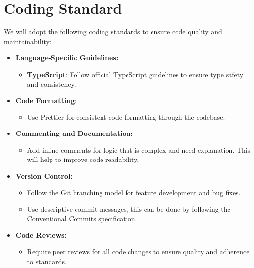 \documentclass{article}
\begin{document}
\section{Coding Standard}

We will adopt the following coding standards to ensure code quality and maintainability:

\begin{itemize}
    \item \textbf{Language-Specific Guidelines:}
    \begin{itemize}
        \item \textbf{TypeScript}: Follow official TypeScript guidelines to ensure type safety and consistency.
    \end{itemize}

    \item \textbf{Code Formatting:}
    \begin{itemize}
        \item Use Prettier for consistent code formatting through the codebase.
    \end{itemize}

    \item \textbf{Commenting and Documentation:}
    \begin{itemize}
        \item Add inline comments for logic that is complex and need explanation. This will help to improve code readability.
    \end{itemize}

    \item \textbf{Version Control:}
    \begin{itemize}
        \item Follow the Git branching model for feature development and bug fixes.
        \item Use descriptive commit messages, this can be done by following the \href{https://www.conventionalcommits.org/en/v1.0.0/}{Conventional Commits} specification.
    \end{itemize}

    \item \textbf{Code Reviews:}
    \begin{itemize}
        \item Require peer reviews for all code changes to ensure quality and adherence to standards.
    \end{itemize}


\end{itemize}
\end{document}
